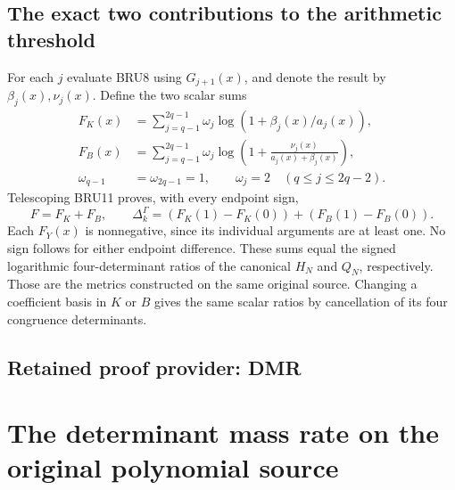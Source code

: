 \documentclass[11pt,a4paper]{article}
\begin{document}
\subsection{The exact two contributions to the arithmetic threshold}

For each $j$ evaluate BRU8 using $G_{j+1}(x)$, and denote the
result by $\beta_j(x),\nu_j(x)$. Define the two scalar sums
\[
 \begin{aligned}
 F_K(x)&=\sum_{j=q-1}^{2q-1}\omega_j
                \log(1+\beta_j(x)/a_j(x)),\\
 F_B(x)&=\sum_{j=q-1}^{2q-1}\omega_j
                \log\left(1+\frac{\nu_j(x)}{a_j(x)+\beta_j(x)}\right),\\
 \omega_{q-1}&=\omega_{2q-1}=1,\qquad
 \omega_j=2\quad(q\leq j\leq2q-2).
 \end{aligned}\tag{BRU20}
\]
Telescoping BRU11 proves, with every endpoint sign,
\[
 \boxed{F=F_K+F_B,\qquad
 \Delta_k^\Gamma=(F_K(1)-F_K(0))+(F_B(1)-F_B(0)).}
 \tag{BRU21}
\]
Each $F_Y(x)$ is nonnegative, since its individual arguments are
at least one. No sign follows for either endpoint difference.
These sums equal the signed logarithmic four-determinant ratios of
the canonical $H_N$ and $Q_N$, respectively. Those are the metrics
constructed on the same original source.
Changing a coefficient basis in $K$ or $B$ gives the same scalar
ratios by cancellation of its four congruence determinants.


\clearpage
\subsection*{Retained proof provider: DMR}

\section{The determinant mass rate on the original polynomial source}
\label{sec:dmr-independent}
\end{document}

